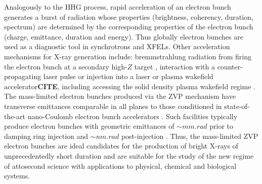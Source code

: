 Analogously to the \ac{HHG} process, rapid acceleration of an electron bunch generates a burst of radiation whose properties (brightness, coherency, duration, spectrum) are determined by the corresponding properties of the electron bunch (charge, emittance, duration and energy). Thus globally electron bunches are used as a diagnostic tool in synchrotrons and XFELs. Other acceleration mechanisms for X-ray generation include: bremmstrahlung radiation from firing the electron bunch at a secondary high-$Z$ target \cite{cordeFemtosecondRaysLaserplasma2013}, interaction with a counter-propagating laser pulse \cite{khrennikovTunableAllOpticalQuasimonochromatic2015,kulaginNonlinearReflectionHighamplitude2016} or injection into a laser or plasma wakefield accelerator\textbf{CITE}, including accessing the solid density plasma wakefield regime \cite{linIsolatedAttosecondElectron2020}. The mass-limited electron bunches produced via the ZVP mechanism have transverse emittances comparable in all planes to those conditioned in state-of-the-art nano-Coulomb electron bunch accelerators \cite{martinDiamondLightSource2020,pingProgressHEPSProject2020}. Such facilities typically produce electron bunches with geometric emittances of $\sim \unit{mm.rad}$ prior to damping ring injection \cite{christouPreInjectorLinacDiamond2004} and $\sim \unit{nm.rad}$ post-injection \cite{martinDiamondLightSource2020}. Thus, the mass-limited ZVP electron bunches are ideal candidates for the production of bright X-rays of unprecedentedly short duration and are suitable for the study of the new regime of attosecond science with applications to physical, chemical and biological systems.

